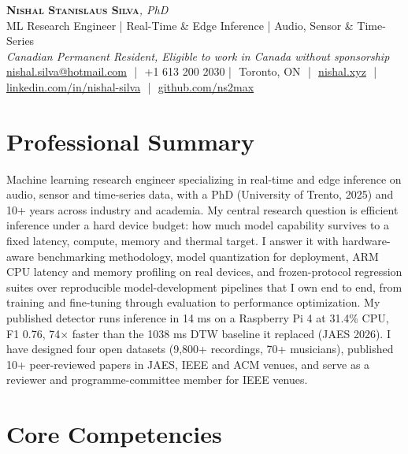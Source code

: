 \documentclass[11pt]{article}
\makeatletter
\newcommand{\cvName}{Nishal Stanislaus Silva}
\newcommand{\cvEmail}{nishal.silva@hotmail.com}
\newcommand{\cvPhone}{+1 613 200 2030}
\newcommand{\cvCity}{Toronto, ON}
\newcommand{\cvSite}{https://nishal.xyz}
\newcommand{\cvLinkedIn}{https://www.linkedin.com/in/nishal-silva}
\newcommand{\cvGitHub}{https://github.com/ns2max}
\newcommand{\cvStatus}{Canadian Permanent Resident, Eligible to work in Canada without sponsorship}
\newcommand{\cvTagline}{ML Research Engineer | Real-Time \& Edge Inference | Audio, Sensor \& Time-Series}
\makeatother
\begin{document}
\pagestyle{empty}
\begin{center}
    {\LARGE \scshape \textbf{\cvName}}{\large \textit{, PhD}}\\[1pt]
    {\small \cvTagline}\\[1pt]
    {\footnotesize\textit{\cvStatus}}\\[1pt]
    {\small
    \href{mailto:\cvEmail}{\cvEmail} \,\,|\,\, \cvPhone \,\,|\,\, \cvCity
    \,\,|\,\, \href{\cvSite}{nishal.xyz} \,\,|\,\, \href{\cvLinkedIn}{linkedin.com/in/nishal-silva}
    \,\,|\,\, \href{\cvGitHub}{github.com/ns2max}}
\end{center}

\section*{Professional Summary}

Machine learning research engineer specializing in real-time and edge inference on audio, sensor and time-series data, with a PhD (University of Trento, 2025) and 10+ years across industry and academia. My central research question is efficient inference under a hard device budget: how much model capability survives to a fixed latency, compute, memory and thermal target. I answer it with hardware-aware benchmarking methodology, model quantization for deployment, ARM CPU latency and memory profiling on real devices, and frozen-protocol regression suites over reproducible model-development pipelines that I own end to end, from training and fine-tuning through evaluation to performance optimization. My published detector runs inference in 14 ms on a Raspberry Pi 4 at 31.4\% CPU, F1 0.76, 74$\times$ faster than the 1038 ms DTW baseline it replaced (JAES 2026). I have designed four open datasets (9,800+ recordings, 70+ musicians), published 10+ peer-reviewed papers in JAES, IEEE and ACM venues, and serve as a reviewer and programme-committee member for IEEE venues.

\section*{Core Competencies}
\end{document}
